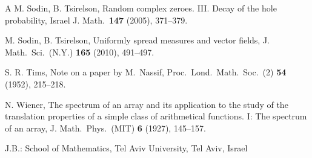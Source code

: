 \documentclass[11pt]{amsart}
\numberwithin{equation}{section}
\begin{document}
\begin{thebibliography}{A}
 M. Sodin, B. Tsirelson,
 Random complex zeroes. III. Decay of the hole probability, Israel J. Math.\ {\bf 147} (2005),
 371--379.

 M. Sodin, B. Tsirelson,
Uniformly spread measures and vector fields, 
J. Math.\ Sci.\ (N.Y.) {\bf 165} (2010), 491--497.

 S. R. Tims,
Note on a paper by M.~Nassif, Proc.\ Lond.\ Math.\ Soc.\ (2) {\bf 54} (1952), 215--218.

 N. Wiener,
The spectrum of an array and its application to the study of the translation
properties of a simple class of arithmetical functions. I: The spectrum of an array, 
J. Math.\ Phys.\ (MIT) {\bf 6} (1927), 145--157.

 

\end{thebibliography}


\bigskip
\medskip

\noindent J.B.:
School of Mathematics, Tel Aviv University, Tel Aviv, Israel
\smallskip\newline{}
\end{document}
